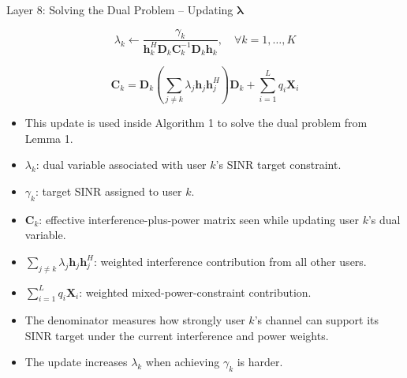 \documentclass{beamer}
\begin{document}
\begin{frame}{Layer 8: Solving the Dual Problem -- Updating \(\boldsymbol{\lambda}\)}
\scriptsize

\[
\lambda_k
\leftarrow
\frac{\gamma_k}
{\mathbf{h}_k^H\mathbf{D}_k\mathbf{C}_k^{-1}\mathbf{D}_k\mathbf{h}_k},
\quad \forall k=1,\ldots,K
\]

\[
\mathbf{C}_k
=
\mathbf{D}_k
\left(
\sum_{j\ne k}
\lambda_j\mathbf{h}_j\mathbf{h}_j^H
\right)
\mathbf{D}_k
+
\sum_{i=1}^{L}q_i\mathbf{X}_i
\]

\begin{itemize}
    \item This update is used inside Algorithm 1 to solve the dual problem from Lemma 1.

    \item \(\lambda_k\): dual variable associated with user \(k\)'s SINR target constraint.

    \item \(\gamma_k\): target SINR assigned to user \(k\).

    \item \(\mathbf{C}_k\): effective interference-plus-power matrix seen while updating user \(k\)'s dual variable.

    \item \(\sum_{j\ne k}\lambda_j\mathbf{h}_j\mathbf{h}_j^H\): weighted interference contribution from all other users.

    \item \(\sum_{i=1}^{L}q_i\mathbf{X}_i\): weighted mixed-power-constraint contribution.

    \item The denominator measures how strongly user \(k\)'s channel can support its SINR target under the current interference and power weights.

    \item The update increases \(\lambda_k\) when achieving \(\gamma_k\) is harder.
\end{itemize}

\end{frame}
\end{document}
